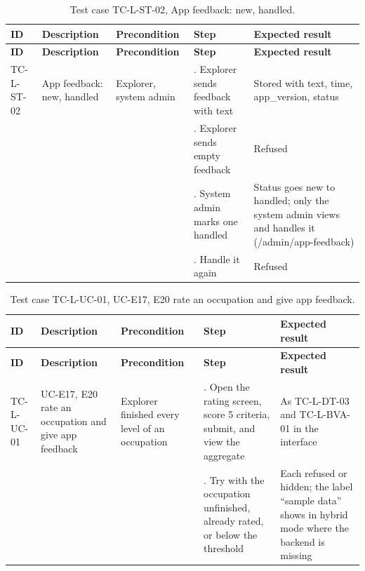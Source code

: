 {\small
\begin{longtable}{|>{\raggedright\arraybackslash}p{}|>{\raggedright\arraybackslash}p{}|>{\raggedright\arraybackslash}p{}|>{\raggedright\arraybackslash}p{}|>{\raggedright\arraybackslash}p{}|}
\caption{Test case TC-L-ST-02, App feedback: new, handled.} \\
\hline
\textbf{ID} & \textbf{Description} & \textbf{Precondition} & \textbf{Step} & \textbf{Expected result} \\ \hline
\endfirsthead
\hline
\textbf{ID} & \textbf{Description} & \textbf{Precondition} & \textbf{Step} & \textbf{Expected result} \\ \hline
\endhead
TC-L-ST-02 & App feedback: new, handled & Explorer, system admin & 1. Explorer sends feedback with text & Stored with text, time, app\_version, status \\ \hline
 &  &  & 2. Explorer sends empty feedback & Refused \\ \hline
 &  &  & 3. System admin marks one handled & Status goes new to handled; only the system admin views and handles it (/admin/app-feedback) \\ \hline
 &  &  & 4. Handle it again & Refused \\ \hline
\end{longtable}
}

{\small
\begin{longtable}{|>{\raggedright\arraybackslash}p{}|>{\raggedright\arraybackslash}p{}|>{\raggedright\arraybackslash}p{}|>{\raggedright\arraybackslash}p{}|>{\raggedright\arraybackslash}p{}|}
\caption{Test case TC-L-UC-01, UC-E17, E20 rate an occupation and give app feedback.} \\
\hline
\textbf{ID} & \textbf{Description} & \textbf{Precondition} & \textbf{Step} & \textbf{Expected result} \\ \hline
\endfirsthead
\hline
\textbf{ID} & \textbf{Description} & \textbf{Precondition} & \textbf{Step} & \textbf{Expected result} \\ \hline
\endhead
TC-L-UC-01 & UC-E17, E20 rate an occupation and give app feedback & Explorer finished every level of an occupation & 1. Open the rating screen, score 5 criteria, submit, and view the aggregate & As TC-L-DT-03 and TC-L-BVA-01 in the interface \\ \hline
 &  &  & 2. Try with the occupation unfinished, already rated, or below the threshold & Each refused or hidden; the label ``sample data'' shows in hybrid mode where the backend is missing \\ \hline
\end{longtable}
}

